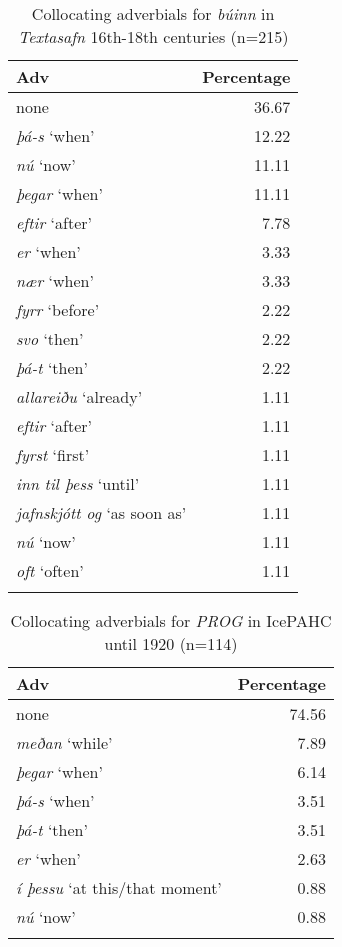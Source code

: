 \documentclass[output=paper,colorlinks,citecolor=brown]{langscibook}
\begin{document}
\begin{table}
    \centering
    \caption{Collocating adverbials for \textit{búinn} in \textit{Textasafn} 16th-18th centuries (n=215)}
    \label{tab:collocating2}
    \begin{tabularx}{0.48\textwidth}{>{\raggedright\arraybackslash}X r}
            \lsptoprule
            Adv & Percentage \\ 
            \midrule
            none & 36.67 \\ 
            \textit{þá-s} `when' & 12.22 \\ 
            \textit{nú} `now' & 11.11 \\ 
            \textit{þegar} `when' & 11.11 \\ 
            \textit{eftir} `after' & 7.78 \\ 
            \textit{er} `when' & 3.33 \\ 
            \textit{nær} `when' & 3.33 \\ 
            \textit{fyrr} `before' & 2.22 \\ 
            \textit{svo} `then' & 2.22 \\ 
            \textit{þá-t} `then' & 2.22 \\ 
            \textit{allareiðu} `already' & 1.11 \\ 
            \textit{eftir} `after' & 1.11 \\ 
            \textit{fyrst} `first' & 1.11 \\ 
            \textit{inn til þess} `until' & 1.11 \\ 
            \textit{jafnskjótt og} `as soon as' & 1.11 \\ 
            \textit{nú} `now' & 1.11 \\ 
            \textit{oft} `often' & 1.11 \\ 
            \lspbottomrule
       \end{tabularx}
\end{table}

\begin{table}
    \centering
    \begin{tabularx}{0.5\textwidth}{>{\raggedright\arraybackslash}p{3cm} r}
        \lsptoprule
        Adv & Percentage \\ 
        \midrule
        none & 74.56 \\ 
        \textit{meðan} `while' & 7.89 \\ 
        \textit{þegar} `when' & 6.14 \\ 
        \textit{þá-s} `when' & 3.51 \\ 
        \textit{þá-t} `then' & 3.51 \\ 
        \textit{er} `when' & 2.63 \\ 
        \textit{í þessu} `at this/that moment' & 0.88 \\ 
        \textit{nú} `now' & 0.88 \\ 
        \lspbottomrule
    \end{tabularx}
    \caption{Collocating adverbials for \textit{PROG} in IcePAHC until 1920 (n=114)}
      \label{tab:collocating3}
\end{table}
\end{document}
